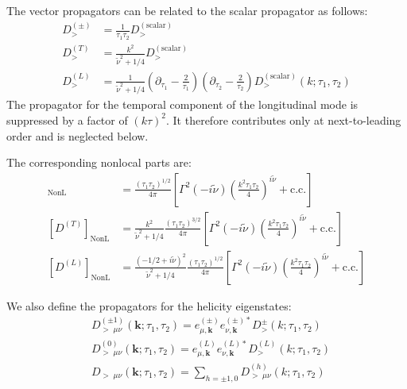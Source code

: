 \documentclass[a4paper,12pt]{article}
\def\mb{\mathbf}
\def\tn{\tilde\nu}
\begin{document}
The vector propagators can be related to the scalar propagator as follows:
\begin{align}
    D_>^{(\pm)} &= \frac{1}{\tau_1 \tau_2} D^{(\text{scalar})}_> \\
    D_>^{(T)} &= \frac{k^2}{\tilde\nu^2 + 1/4} D^{(\text{scalar})}_> \\
    D_{>}^{(L)} &= \frac{1}{\tilde\nu^2 + 1/4}\left(\partial_{\tau_{1}}-\frac{2}{\tau_{1}}\right)\left(\partial_{\tau_{2}}-\frac{2}{\tau_{2}}\right) D_{>}^{(\text{scalar})}\left(k ; \tau_{1}, \tau_{2}\right) 
\end{align}
The propagator for the temporal component of the longitudinal mode is suppressed by a factor of $(k\tau)^2$. It therefore contributes only at next-to-leading order and is neglected below.

The corresponding nonlocal parts are:
\begin{align}
    [D^{(\pm)}]_{\text{NonL}} &= \frac{(\tau_1 \tau_2)^{1/2}}{4\pi} \left[ \Gamma^2(-i\tn) \left( \frac{k^2\tau_1\tau_2}{4} \right)^{i\tn} +\text{c.c.} \right] \\
    [D^{(T)}]_{\text{NonL}} &= \frac{k^2}{\tilde\nu^2 + 1/4} \frac{(\tau_1 \tau_2)^{3/2}}{4\pi} \left[ \Gamma^2(-i\tn) \left( \frac{k^2\tau_1\tau_2}{4} \right)^{i\tn} +\text{c.c.} \right] \\
    [D^{(L)}]_{\text{NonL}} &= \frac{(-1/2+i\tn)^2}{\tilde\nu^2 + 1/4} \frac{(\tau_1 \tau_2)^{1/2}}{4\pi} \left[ \Gamma^2(-i\tn) \left( \frac{k^2\tau_1\tau_2}{4} \right)^{i\tn} +\text{c.c.} \right]
\end{align}

We also define the propagators for the helicity eigenstates:
\begin{align}
    &D_{>\;\mu\nu}^{{(\pm1)}} \left(\mb k ; \tau_{1}, \tau_{2}\right) = e_{\mu,\mb k}^{(\pm) } e_{\nu, \mb k}^{(\pm)*} D_{>}^{\pm} \left(k ; \tau_{1}, \tau_{2}\right) \\
    &D_{>\;\mu\nu}^{{(0)}} \left(\mb k ; \tau_{1}, \tau_{2}\right) =  e_{\mu,\mb k}^{(L)} e_{\nu, \mb k}^{(L)*} D_{>}^{(L)}\left(k ; \tau_{1}, \tau_{2}\right) \\
    &D_{>\;\mu\nu}^{} \left(\mb k ; \tau_{1}, \tau_{2}\right) = \sum_{h=\pm1,0} D_{>\;\mu\nu}^{{(h)}} \left(k ; \tau_{1}, \tau_{2}\right)
\end{align}
\end{document}

